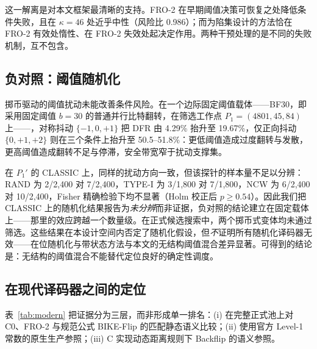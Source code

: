 \documentclass[UTF8,a4paper,10pt,twocolumn]{ctexart}
\begin{document}
这一解离是对本文框架最清晰的支持。FRO-2 在早期阈值决策可恢复之处降低条件失败，且在 $\kappa=46$ 处近乎中性（风险比 0.986）；而为陷集设计的方法恰在 FRO-2 有效处惰性、在 FRO-2 失效处起决定作用。两种干预处理的是不同的失败机制，互不包含。

\subsection{负对照：阈值随机化}\label{sec:negative}

掷币驱动的阈值扰动未能改善条件风险。在一个边际固定阈值载体——BF30，即采用固定阈值 $b=30$ 的普通并行比特翻转，在筛选工作点 $P_1=(4801,45,84)$ 上——，对称抖动 $\{-1,0,+1\}$ 把 DFR 由 4.29\% 抬升至 19.67\%，仅正向抖动 $\{0,+1,+2\}$ 则在三个条件上抬升至 50.5--51.8\%：更低阈值造成过度翻转与发散，更高阈值造成翻转不足与停滞，安全带宽窄于扰动支撑集。

在 $P_1'$ 的 CLASSIC 上，同样的扰动方向一致，但该探针的样本量不足以分辨：RAND 为 2/2{,}400 对 7/2{,}400，TYPE-I 为 3/1{,}800 对 7/1{,}800，NCW 为 6/2{,}400 对 10/2{,}400，Fisher 精确检验下均不显著（Holm 校正后 $p\ge 0.54$）。因此我们把 CLASSIC 上的随机化结果报告为\emph{未分辨}而非证据，负对照的结论建立在固定载体上——那里的效应跨越一个数量级。在正式候选搜索中，两个掷币式变体均未通过筛选。这些结果在本设计空间内否定了随机化假设，但\emph{不}证明所有随机化译码器无效——在位随机化与带状态方法与本文的无结构阈值混合差异显著\cite{baldi2021inplace}。可得到的结论是：无结构的阈值混合不能替代定位良好的确定性调度。

\subsection{在现代译码器之间的定位}\label{sec:modern}

表~\ref{tab:modern} 把证据分为三层，而非形成单一排名：(i) 在完整正式池上对 C0、FRO-2 与规范公式 BIKE-Flip 的匹配静态语义比较；(ii) 使用官方 Level-1 常数的原生生产参照；(iii) C 实现动态距离规则下 Backflip 的语义参照。
\end{document}
